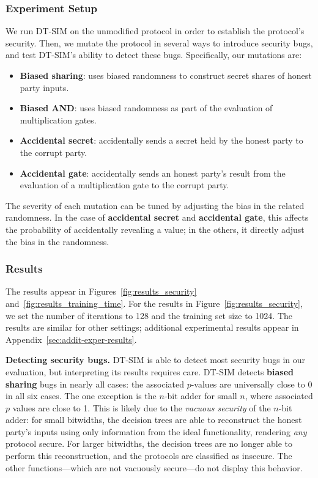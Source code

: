 \documentclass[compsoc, conference, a4paper, 10pt, times]{IEEEtran}
\renewcommand{\paragraph}[1]{\vspace*{2pt}\noindent\textbf{#1}}
\newcommand{\toolname}{\textsc{DT-SIM}\xspace}
\begin{document}
\subsubsection{Experiment Setup}
\label{sec:e2-experiment-setup}

We run \toolname on the unmodified protocol in order to establish the protocol's security. Then, we mutate the protocol in several ways to introduce security bugs, and test \toolname's ability to detect these bugs. Specifically, our mutations are:
%
\begin{itemize}
\item \textbf{Biased sharing}: uses biased randomness to construct secret shares of honest party inputs.
\item \textbf{Biased AND}: uses biased randomness as part of the evaluation of multiplication gates.
\item \textbf{Accidental secret}: accidentally sends a secret held by the honest party  to the corrupt party.
\item \textbf{Accidental gate}: accidentally sends an honest party's result from the evaluation of a multiplication gate to the corrupt party.
\end{itemize}
%
The severity of each mutation can be tuned by adjusting the bias in the related randomness. In the case of \textbf{accidental secret} and \textbf{accidental gate}, this affects the probability of accidentally revealing a value; in the others, it directly adjust the bias in the randomness.

\subsubsection{Results}
\label{sec:e2_results}

The results appear in Figures~\ref{fig:results_security} and~\ref{fig:results_training_time}. For the results in Figure~\ref{fig:results_security}, we set the number of iterations to 128 and the training set size to 1024. The results are similar for other settings; additional experimental results appear in Appendix~\ref{sec:addit-exper-results}.

\paragraph{Detecting security bugs.}
\toolname is able to detect most security bugs in our evaluation, but interpreting its results requires care. \toolname detects \textbf{biased sharing} bugs in nearly all cases: the associated $p$-values are universally close to 0 in all six cases. The one exception is the $n$-bit adder for small $n$, where associated $p$ values are close to 1. This is likely due to the \emph{vacuous security} of the $n$-bit adder: for small bitwidths, the decision trees are able to reconstruct the honest party's inputs using only information from the ideal functionality, rendering \emph{any} protocol secure. For larger bitwidths, the decision trees are no longer able to perform this reconstruction, and the protocols are classified as insecure. The other functions---which are not vacuously secure---do not display this behavior.
\end{document}
